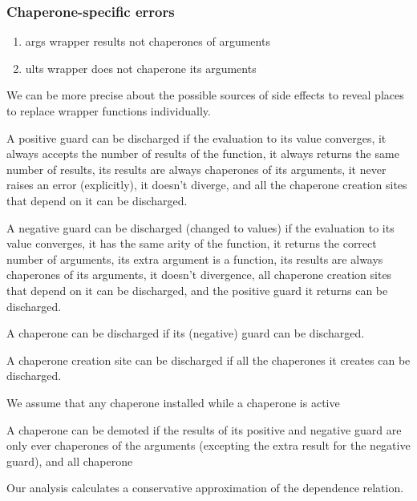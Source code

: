 \documentclass{sigplanconf}
\begin{document}
\subsubsection{Chaperone-specific errors}
\begin{enumerate}
\item args wrapper results not chaperones of arguments
\item ults wrapper does not chaperone its arguments
\end{enumerate}

We can be more precise about the possible sources of side effects to reveal places to replace wrapper functions individually.

A positive guard can be discharged if the evaluation to its value converges, it always accepts the number of results of the function, it always returns the same number of results, its results are always chaperones of its arguments, it never raises an error (explicitly), it doesn't diverge, and all the chaperone creation sites that depend on it can be discharged.

A negative guard can be discharged (changed to values) if the evaluation to its value converges, it has the same arity of the function, it returns the correct number of arguments, its extra argument is a function, its results are always chaperones of its arguments, it doesn't divergence, all chaperone creation sites that depend on it can be discharged, and the positive guard it returns can be discharged.


A chaperone can be discharged if its (negative) guard can be discharged.

A chaperone creation site can be discharged if all the chaperones it creates can be discharged.

We assume that any chaperone installed while a chaperone is active 

A chaperone can be demoted if the results of its positive and negative guard are only ever chaperones of the arguments (excepting the extra result for the negative guard), and all chaperone 

Our analysis calculates a conservative approximation of the dependence relation.
\end{document}
